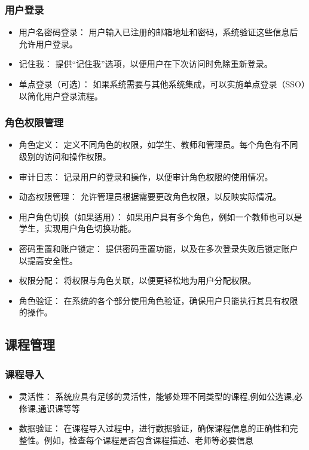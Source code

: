 \documentclass{article}
\begin{document}
\subsubsection{用户登录}
\begin{itemize}
        \item 用户名密码登录： 用户输入已注册的邮箱地址和密码，系统验证这些信息后允许用户登录。
        \item 记住我： 提供“记住我”选项，以便用户在下次访问时免除重新登录。
        \item 单点登录（可选）： 如果系统需要与其他系统集成，可以实施单点登录（SSO）以简化用户登录流程。 
\end{itemize}
\subsubsection{角色权限管理}
\begin{itemize}
        \item 角色定义： 定义不同角色的权限，如学生、教师和管理员。每个角色有不同级别的访问和操作权限。
        \item 审计日志： 记录用户的登录和操作，以便审计角色权限的使用情况。
        \item 动态权限管理： 允许管理员根据需要更改角色权限，以反映实际情况。
        \item 用户角色切换（如果适用）： 如果用户具有多个角色，例如一个教师也可以是学生，实现用户角色切换功能。
        \item 密码重置和账户锁定： 提供密码重置功能，以及在多次登录失败后锁定账户以提高安全性。
        \item 权限分配： 将权限与角色关联，以便更轻松地为用户分配权限。 
        \item 角色验证： 在系统的各个部分使用角色验证，确保用户只能执行其具有权限的操作。
\end{itemize}
\subsection{课程管理}
\subsubsection{课程导入}
\begin{itemize}
        \item 灵活性： 系统应具有足够的灵活性，能够处理不同类型的课程,例如公选课,必修课,通识课等等
        \item 数据验证： 在课程导入过程中，进行数据验证，确保课程信息的正确性和完整性。例如，检查每个课程是否包含课程描述、老师等必要信息
\end{itemize}
\end{document}
